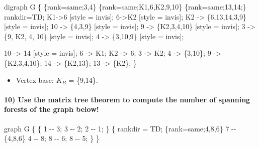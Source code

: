 \documentclass[
]{article}
\newenvironment{Shaded}{}{}
\newcommand{\NormalTok}[1]{#1}
\providecommand{\tightlist}{%
  \setlength{\itemsep}{0pt}\setlength{\parskip}{0pt}}
\begin{document}
\begin{Shaded}
\begin{Highlighting}[]
\NormalTok{digraph G \{ }
\NormalTok{    \{rank=same;3,4\}}
\NormalTok{    \{rank=same;K1,6,K2,9,10\}}
\NormalTok{    \{rank=same;13,14;\}}
\NormalTok{    rankdir=TD;}
\NormalTok{    K1{-}\textgreater{}6 [style = invis];}
\NormalTok{    6{-}\textgreater{}K2 [style = invis];}
\NormalTok{        K2 {-}\textgreater{} \{6,13,14,3,9\} [style = invis];}
\NormalTok{        10 {-}\textgreater{} \{4,3,9\} [style = invis];}
\NormalTok{        9 {-}\textgreater{} \{K2,3,4,10\} [style = invis];}
\NormalTok{        3 {-}\textgreater{} \{9, K2, 4, 10\} [style = invis];}
\NormalTok{        4 {-}\textgreater{} \{3,10,9\} [style = invis];}
        
        
\NormalTok{        10 {-}\textgreater{} 14 [style = invis];}
\NormalTok{        6 {-}\textgreater{} K1;}
\NormalTok{        K2 {-}\textgreater{} 6;}
\NormalTok{        3 {-}\textgreater{} K2;}
\NormalTok{        4 {-}\textgreater{} \{3,10\};}
\NormalTok{        9 {-}\textgreater{} \{K2,3,4,10\};}
\NormalTok{        14 {-}\textgreater{} \{K2,13\};}
\NormalTok{        13 {-}\textgreater{} \{K2\};}
\NormalTok{    \}}
\end{Highlighting}
\end{Shaded}

\begin{itemize}
\tightlist
\item
  Vertex base: \(K_B\) = \{9,14\}.
\end{itemize}

\hypertarget{use-the-matrix-tree-theorem-to-compute-the-number-of-spanning-forests-of-the-graph-below}{%
\paragraph{10) Use the matrix tree theorem to compute the number of
spanning forests of the graph
below!}\label{use-the-matrix-tree-theorem-to-compute-the-number-of-spanning-forests-of-the-graph-below}}

\begin{Shaded}
\begin{Highlighting}[]
\NormalTok{graph G }
\NormalTok{\{ }
\NormalTok{    \{}
\NormalTok{    1 {-}{-} 3;}
\NormalTok{    3 {-}{-} 2;}
\NormalTok{    2 {-}{-} 1;}
\NormalTok{    \}}
\NormalTok{    \{}
\NormalTok{    rankdir = TD;}
\NormalTok{    \{rank=same;4,8,6\}}
\NormalTok{    7 {-}{-} \{4,8,6\}}
\NormalTok{    4 {-}{-} 8;}
\NormalTok{    8 {-}{-} 6;}
\NormalTok{    8 {-}{-} 5;}
\NormalTok{    \}}
\NormalTok{\}}
\end{Highlighting}
\end{Shaded}
\end{document}
